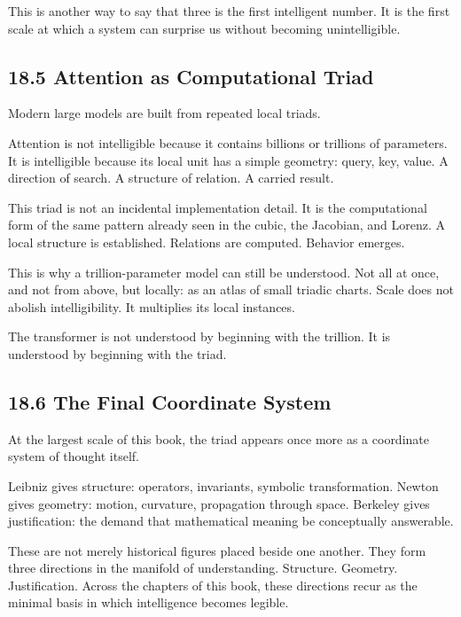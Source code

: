 This is another way to say that three is the first intelligent number.
It is the first scale at which a system can surprise us without becoming
unintelligible.

\hypertarget{attention-as-computational-triad}{%
\subsection{18.5 Attention as Computational
Triad}\label{attention-as-computational-triad}}

Modern large models are built from repeated local triads.

Attention is not intelligible because it contains billions or trillions
of parameters. It is intelligible because its local unit has a simple
geometry: query, key, value. A direction of search. A structure of
relation. A carried result.

This triad is not an incidental implementation detail. It is the
computational form of the same pattern already seen in the cubic, the
Jacobian, and Lorenz. A local structure is established. Relations are
computed. Behavior emerges.

This is why a trillion-parameter model can still be understood. Not all
at once, and not from above, but locally: as an atlas of small triadic
charts. Scale does not abolish intelligibility. It multiplies its local
instances.

The transformer is not understood by beginning with the trillion. It is
understood by beginning with the triad.

\hypertarget{the-final-coordinate-system}{%
\subsection{18.6 The Final Coordinate
System}\label{the-final-coordinate-system}}

At the largest scale of this book, the triad appears once more as a
coordinate system of thought itself.

Leibniz gives structure: operators, invariants, symbolic transformation.
Newton gives geometry: motion, curvature, propagation through space.
Berkeley gives justification: the demand that mathematical meaning be
conceptually answerable.

These are not merely historical figures placed beside one another. They
form three directions in the manifold of understanding. Structure.
Geometry. Justification. Across the chapters of this book, these
directions recur as the minimal basis in which intelligence becomes
legible.

